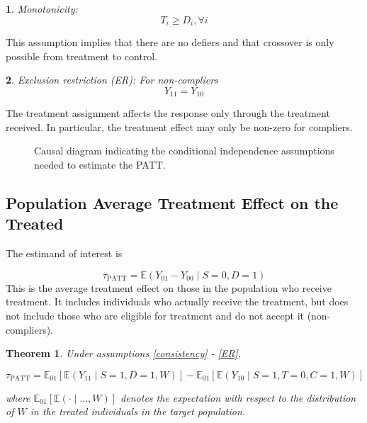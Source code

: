 \documentclass[12pt]{article}
\makeatletter
\newtheorem{theorem}{Theorem}
\newtheorem*{assumption*}{\assumptionnumber}
\providecommand{\assumptionnumber}{}
\newenvironment{assumption}[2]
 {%
  \renewcommand{\assumptionnumber}{Assumption #1}%
  \begin{assumption*}%
  \protected@edef\@currentlabel{#1}%
 }
 {%
  \end{assumption*}
 }
\newcommand{\ex}{\mathbb{E}} %
\makeatother
\begin{document}
\begin{assumption}{6}{}\label{monotonicity}
Monotonicity: 
\begin{equation*}
T_i \geq D_i, \forall i
\end{equation*}
\end{assumption}
\noindent This assumption implies that there are no defiers and that crossover is only possible from treatment to control.

\begin{assumption}{7}{}\label{ER}
Exclusion restriction (ER): For non-compliers
\begin{equation*}
Y_{11} = Y_{10}
\end{equation*}  
\end{assumption}
\noindent The treatment assignment affects the response only through the treatment received.  In particular, the treatment effect may only be non-zero for compliers.  

\begin{figure}[h]
\centering
{}
\caption{Causal diagram indicating the conditional independence assumptions needed to estimate the PATT.}\label{fig:DAG}
\end{figure}

\subsection{Population Average Treatment Effect on the Treated}
The estimand of interest is 

\begin{equation}
\tau_{\text{PATT}} = \ex\left( Y_{01} - Y_{00} \mid S=0, D=1\right)
\end{equation}
This is the average treatment effect on those in the population who receive treatment.  It includes individuals who actually receive the treatment, but does not include those who are eligible for treatment and do not accept it (non-compliers).

\begin{theorem}\label{thm1}
Under assumptions \eqref{consistency} - \eqref{ER},

$$\tau_{\text{PATT}} = \ex_{01}\left[  \ex\left(Y_{11} \mid S=1, D=1, W\right)\right]
-\ex_{01}\left[  \ex\left(Y_{10} \mid S=1, T=0, C=1, W\right) \right] $$

where $\ex_{01}\left[\ex(\cdot \mid\dots, W)\right]$ denotes the expectation with respect to the distribution of $W$ in the treated individuals in the target population.  
\end{theorem}
\end{document}

